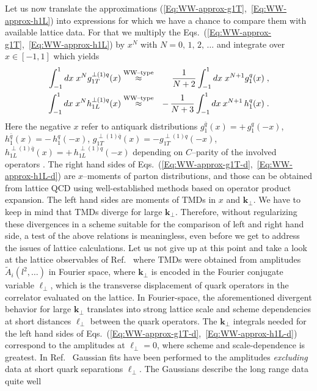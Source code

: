\documentclass[a4paper,11pt]{article}
\newcommand{\blue}[1]{{\color{blue} #1}}
\newcommand{\ba}{\begin{eqnarray}}
\newcommand{\ea}{\end{eqnarray}}
\newcommand{\ps}[1]{\blue{#1}}
\newcommand{\WWtype}{\ensuremath{\stackrel{\text{\scriptsize WW--type}}{\approx}}}
\def\bflperp{{\bm \ell}_\perp}
\def\bfkperp{{\bm k}_\perp}
\begin{document}
Let us now translate the approximations
(\ref{Eq:WW-approx-g1T},~\ref{Eq:WW-approx-h1L}) into expressions
for which we have a chance to compare them with available lattice data.
For that we multiply the
Eqs.~(\ref{Eq:WW-approx-g1T},~\ref{Eq:WW-approx-h1L}) by $x^N$
with $N=0,\,1,\,2,\,\dots$ and integrate over $x\in[-1,1]$ which yields
\ba
        \int_{-1}^1 d x\;x^N
       g_{1T}^{\perp(1)q}(x)&\WWtype&
        \phantom{-} \,\frac{1}{N+2} \int_{-1}^1 d x \;x^{N+1}g_1^q(x)
        \;,
    \label{Eq:WW-approx-g1T-d}\\
        \int_{-1}^1 d x\;x^N
        h_{1L}^{\perp(1)q}(x)&\WWtype&
        -\,\frac{1}{N+3} \int_{-1}^1 d x\: x^{N+1}\,h_1^q(x)
        \;.
    \label{Eq:WW-approx-h1L-d}
\ea
\ps{Here the} %
negative $x$ refer to antiquark distributions
$g_1^{\bar q}(x) = +\,g_1^{q}(-x)$,
$h_1^{\bar q}(x) = -\,h_1^{q}(-x)$,
$g_{1T}^{\perp(1)\bar q}(x) =- g_{1T}^{\perp(1)q}(-x)$,
$h_{1L}^{\perp(1)\bar q}(x) = +\,h_{1L}^{\perp(1)q}(-x)$
depending on $C$--parity of the involved operators \cite{Mulders:1995dh}.
The right hand sides of
Eqs.~(\ref{Eq:WW-approx-g1T-d},~\ref{Eq:WW-approx-h1L-d}) are $x$--moments
of parton distributions, and those can be obtained from lattice QCD using
well-established methods based on operator product expansion.
The left hand sides are moments of TMDs in $x$ and $\bfkperp$. We have to
keep in mind that TMDs diverge for large $\bfkperp$. Therefore, without
regularizing these divergences in a scheme suitable for the comparison of
left and right hand side, a test of the above relations is meaningless,
even before we get to address the issues of lattice calculations. Let us
not give up at this point and take a look at the lattice observables of
Ref.~\cite{Musch:2010ka} \ps{where} TMDs \ps{were} obtained from amplitudes
$\tilde A_i(l^2,\ldots)$ in Fourier space, where $\bfkperp$ is encoded
in the Fourier conjugate variable $\bflperp$, which is the transverse
displacement of quark operators in the correlator evaluated on the lattice.
In Fourier-space, the aforementioned divergent behavior for large $\bfkperp$
translates into strong lattice scale and scheme dependencies at short distances
$\bflperp$ between the quark operators. The $\bfkperp$ integrals needed for
the left hand sides of Eqs.~(\ref{Eq:WW-approx-g1T-d},~\ref{Eq:WW-approx-h1L-d})
correspond to the amplitudes at $\bflperp = 0$, where scheme and
scale-dependence is greatest.  In Ref.~\cite{Musch:2010ka} Gaussian fits
have been performed to the amplitudes \emph{excluding} data at short quark
separations $\bflperp$. The Gaussians describe the long range data quite well
\end{document}
